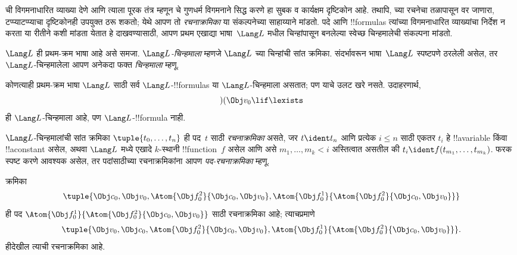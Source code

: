\documentclass[../../../include/open-logic-section]{subfiles}
\begin{document}


ची विगमनाधारित व्याख्या देणे आणि त्याला पूरक तंत्र म्हणून
चे गुणधर्म विगमनाने सिद्ध करणे हा सुबक व कार्यक्षम
दृष्टिकोन आहे. तथापि, च्या रचनेचा तळापासून वर जाणारा,
टप्प्याटप्प्याचा दृष्टिकोनही उपयुक्त ठरू शकतो; येथे आपण तो
\emph{रचनाक्रमिका} या संकल्पनेच्या साहाय्याने मांडतो.
%
पदे आणि !!{formula}s त्यांच्या विगमनाधारित व्याख्यांचा निर्देश न करता
या रीतीने कशी मांडता येतात हे दाखवण्यासाठी, आपण प्रथम एखाद्या
भाषा~$\Lang L$ मधील चिन्हांपासून बनलेल्या स्वेच्छ चिन्हमालेची संकल्पना
मांडतो.

\begin{defn}[चिन्हमाला]
$\Lang L$ ही प्रथम-क्रम भाषा आहे असे समजा. \emph{$\Lang L$-चिन्हमाला}
म्हणजे $\Lang L$ च्या चिन्हांची सांत क्रमिका. संदर्भावरून भाषा~$\Lang L$
स्पष्टपणे ठरलेली असेल, तर $\Lang L$-चिन्हमालेला आपण अनेकदा फक्त
\emph{चिन्हमाला} म्हणू.
\end{defn}

\begin{ex}
कोणत्याही प्रथम-क्रम भाषा $\Lang L$ साठी सर्व $\Lang L$-!!{formula}s
या $\Lang L$-चिन्हमाला असतात; पण याचे उलट खरे नसते. उदाहरणार्थ,
\[)(\Obj v_0\lif\lexists\] ही $\Lang L$-चिन्हमाला आहे, पण
$\Lang L$-!!{formula} नाही.
\end{ex}

\begin{defn}[पदांसाठी रचनाक्रमिका]
\olmrdefinitionlayout{}
$\Lang L$-चिन्हमालांची सांत क्रमिका $\tuple{t_0,\dotsc,t_n}$ ही पद~$t$
साठी \emph{रचनाक्रमिका} असते, जर $t \ident t_n$ आणि प्रत्येक $i \leq n$
साठी एकतर $t_i$ हे !!a{variable} किंवा !!a{constant} असेल, अथवा $\Lang
L$ मध्ये एखादे $k$-स्थानी !!{function}~$f$ असेल आणि असे
$m_1,\dotsc,m_k < i$ अस्तित्वात असतील की
$t_i \ident f(t_{m_1},\dotsc,t_{m_k})$. फरक स्पष्ट करणे आवश्यक असेल,
तर पदांसाठीच्या रचनाक्रमिकांना आपण \emph{पद-रचनाक्रमिका} म्हणू.
\end{defn}

\begin{ex}
क्रमिका
\[
    \tuple{\Obj c_0, \Obj v_0, \Atom{\Obj f^2_0}{\Obj c_0, \Obj v_0}, \Atom{\Obj f^1_0}{\Atom{\Obj f^2_0}{\Obj c_0, \Obj v_0}}}
\]
ही पद $\Atom{\Obj f^1_0}{\Atom{\Obj
f^2_0}{\Obj c_0, \Obj v_0}}$ साठी रचनाक्रमिका आहे; त्याचप्रमाणे
\[
    \tuple{\Obj v_0, \Obj c_0, \Atom{\Obj f^2_0}{\Obj c_0, \Obj v_0}, \Atom{\Obj f^1_0}{\Atom{\Obj f^2_0}{\Obj c_0, \Obj v_0}}}.
\]
हीदेखील त्याची रचनाक्रमिका आहे.
\end{ex}
\end{document}
